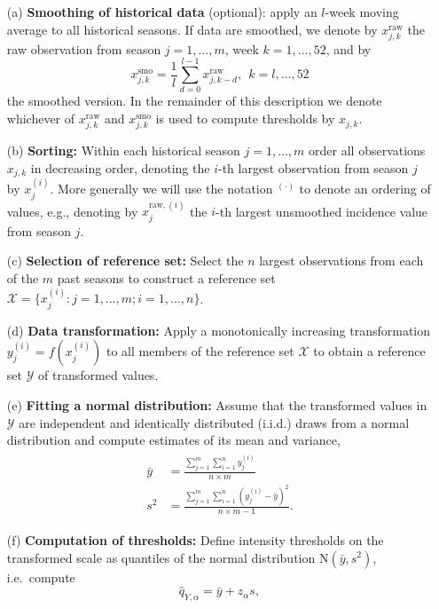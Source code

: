 \documentclass[12pt]{article}
\newcommand{\sd}{s}
\begin{document}
\begin{enumerate}
\item[(a)] \textbf{Smoothing of historical data} (optional): apply an $l$-week moving average to all historical seasons. If data are smoothed, we denote by $x^\text{raw}_{j, k}$ the raw observation from season $j = 1, \dots, m$, week $k = 1, \dots, 52$, and by
$$
x^\text{smo}_{j, k} = \frac{1}{l} \sum_{d = 0}^{l - 1} x^\text{raw}_{j, k - d}, \ \ k = l, \dots, 52
$$ the smoothed version. In the remainder of this description we denote whichever of $x^\text{raw}_{j, k}$ and $x^\text{smo}_{j, k}$ is used to compute thresholds by $x_{j, k}$.
\item[(b)] \textbf{Sorting:} Within each historical season $j = 1, \dots, m$ order all observations $x_{j, k}$ in decreasing order, denoting the $i$-th largest observation from season $j$ by $x^{(i)}_j$. More generally we will use the notation $^{(\cdot)}$ to denote an ordering of values, e.g., denoting by $x^{\text{raw}, (i)}_j$ the $i$-th largest unsmoothed incidence value from season $j$.
\item[(c)] \textbf{Selection of reference set:} Select the $n$ largest observations from each of the $m$ past seasons to construct a reference set $\mathcal{X} = \{x_j^{(i)}: j = 1, \dots, m; i = 1, \dots, n\}$.
\item[(d)] \textbf{Data transformation:} Apply a monotonically increasing transformation $y_j^{(i)} = f(x_j^{(i)})$ to all members of the reference set $\mathcal{X}$ to obtain a reference set $\mathcal{Y}$ of transformed values.
\item[(e)] \textbf{Fitting a normal distribution:} Assume that the transformed values in $\mathcal{Y}$ are independent and identically distributed (i.i.d.) draws from a normal distribution and compute estimates of its mean and variance,
\begin{align}
\begin{split}
\bar{y} & = \frac{\sum_{j = 1}^m\sum_{i = 1}^n y_j^{(i)}}{n\times m}\\
\sd^2 & = \frac{\sum_{j = 1}^m\sum_{i = 1}^n \left(y_j^{(i)}  - \bar{y}\right)^2}{n\times m - 1}.
\end{split}\label{eq:moments}
\end{align}
\item[(f)] \textbf{Computation of thresholds:} Define intensity thresholds on the transformed scale as quantiles of the normal distribution N$(\bar{y}, \sd^2)$, i.e.\ compute
\begin{equation}
\hat{q}_{Y, \alpha} = \bar{y} + z_\alpha \sd, \label{eq:def_q}

\end{equation}
\end{enumerate}
\end{document}
